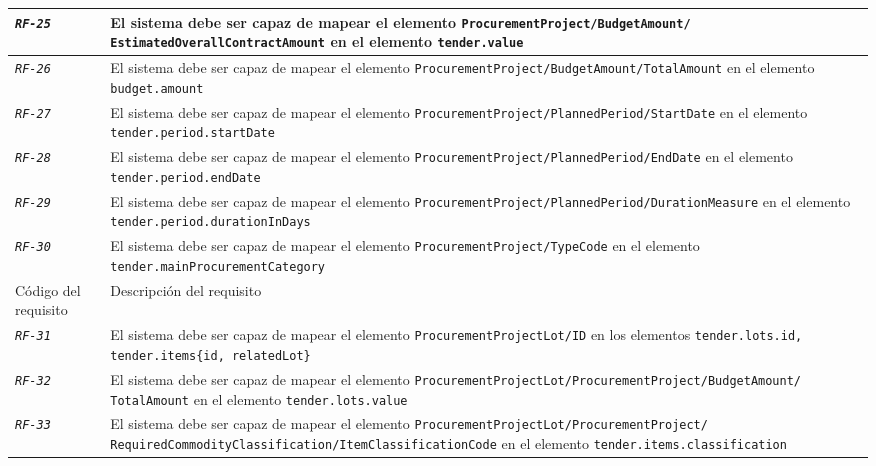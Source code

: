 \begin{longtable}{|| M{3cm} | M{12cm} ||}
                \hline
                    \texttt{\textit{RF-25}} & El sistema debe ser capaz de mapear el elemento \texttt{ProcurementProject/BudgetAmount/
                    EstimatedOverallContractAmount} en el elemento \texttt{tender.value} \\
                \hline
                    \texttt{\textit{RF-26}} & El sistema debe ser capaz de mapear el elemento \texttt{ProcurementProject/BudgetAmount/TotalAmount} en el elemento \texttt{budget.amount} \\
                \hline
                    \texttt{\textit{RF-27}} & El sistema debe ser capaz de mapear el elemento \texttt{ProcurementProject/PlannedPeriod/StartDate} en el elemento \texttt{tender.period.startDate} \\
                \hline
                    \texttt{\textit{RF-28}} & El sistema debe ser capaz de mapear el elemento \texttt{ProcurementProject/PlannedPeriod/EndDate} en el elemento \texttt{tender.period.endDate} \\
                \hline
                    \texttt{\textit{RF-29}} & El sistema debe ser capaz de mapear el elemento \texttt{ProcurementProject/PlannedPeriod/DurationMeasure} en el elemento \texttt{tender.period.durationInDays} \\
                \hline
                    \texttt{\textit{RF-30}} & El sistema debe ser capaz de mapear el elemento \texttt{ProcurementProject/TypeCode} en el elemento \texttt{tender.mainProcurementCategory} \\
                \hline
\newpage
                \hline
                    Código del requisito & Descripción del requisito \\
                \hline
                \hline
                    \texttt{\textit{RF-31}} & El sistema debe ser capaz de mapear el elemento \texttt{ProcurementProjectLot/ID} en los elementos \texttt{tender.lots.id, tender.items\{id, relatedLot\}} \\
                \hline
                    \texttt{\textit{RF-32}} & El sistema debe ser capaz de mapear el elemento \texttt{ProcurementProjectLot/ProcurementProject/BudgetAmount/
                    TotalAmount} en el elemento \texttt{tender.lots.value} \\
                \hline
                    \texttt{\textit{RF-33}} & El sistema debe ser capaz de mapear el elemento \texttt{ProcurementProjectLot/ProcurementProject/
                    RequiredCommodityClassification/ItemClassificationCode} en el elemento \texttt{tender.items.classification} \\

\end{longtable}
